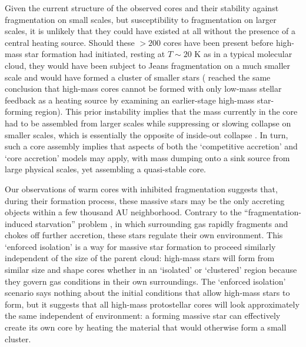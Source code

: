 \documentclass{emulateapj}
\begin{document}
Given the current structure of the observed cores and their stability against
fragmentation on small scales, but susceptibility to fragmentation on larger
scales, it is unlikely that they could have existed at all without the presence
of a central heating source.  Should these $>200$ \msun cores have been present
before high-mass star formation had initiated, resting at $T\sim20$ K as in a
typical molecular cloud, they would have been subject to Jeans fragmentation on
a much smaller scale and would have formed a cluster of smaller stars
(\citet{Longmore2011a} reached the same conclusion that high-mass cores cannot
be formed with only low-mass stellar feedback as a heating source by examining
an earlier-stage high-mass star-forming region).  This prior instability
implies that the mass currently in the core had to be assembled from larger
scales while suppressing or slowing collapse on smaller scales, which is
essentially the opposite of inside-out collapse \citep{Naranjo-Romero2015a}.
In turn, such a core assembly implies that aspects of both the `competitive
accretion' and `core accretion' models may apply, with mass dumping onto a sink
source from large physical scales, yet assembling a quasi-stable core.


Our observations of warm cores with inhibited fragmentation suggests that,
during their formation process, these massive stars may be the only accreting
objects within a few thousand AU neighborhood.  Contrary to the
``fragmentation-induced starvation'' problem
\citep{Peters2010a,Peters2010c,Girichidis2012b}, in which surrounding gas
rapidly fragments and chokes off further accretion, these stars regulate their
own environment.  This `enforced isolation' is a way for massive
star formation to proceed similarly independent of the size of the parent
cloud: high-mass stars will form from similar size and shape cores whether in
an `isolated' or `clustered' region because they govern gas conditions in their
own surroundings.  The `enforced isolation' scenario says nothing about the
initial conditions that allow high-mass stars to form, but it suggests that all
high-mass protostellar cores will look approximately the same independent of
environment: a forming massive star can effectively create its own core by
heating the material that would otherwise form a small cluster.
\end{document}
